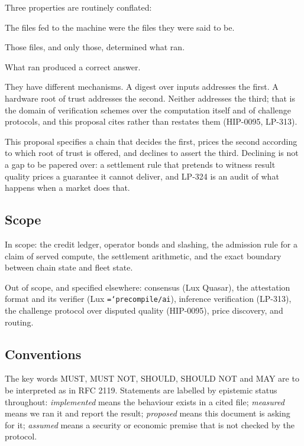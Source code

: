 \documentclass[11pt,a4paper]{article}
\newcommand{\code}[1]{\texttt{\hyphenchar\font=`\-\relax #1}}
\begin{document}
Three properties are routinely conflated:

\begin{description}[leftmargin=1.4em]
  \item[Integrity of the inputs.] The files fed to the machine were the files
    they were said to be.
  \item[Fidelity of execution.] Those files, and only those, determined what
    ran.
  \item[Quality of the result.] What ran produced a correct answer.
\end{description}

They have different mechanisms. A digest over inputs addresses the first. A
hardware root of trust addresses the second. Neither addresses the third; that
is the domain of verification schemes over the computation itself and of
challenge protocols, and this proposal cites rather than restates them
(HIP-0095, LP-313).

This proposal specifies a chain that decides the first, prices the second
according to which root of trust is offered, and declines to assert the third.
Declining is not a gap to be papered over: a settlement rule that pretends to
witness result quality prices a guarantee it cannot deliver, and LP-324 is an
audit of what happens when a market does that.

\subsection{Scope}

In scope: the credit ledger, operator bonds and slashing, the admission rule
for a claim of served compute, the settlement arithmetic, and the exact
boundary between chain state and fleet state.

Out of scope, and specified elsewhere: consensus (Lux Quasar), the attestation
format and its verifier (Lux \code{precompile/ai}), inference verification
(LP-313), the challenge protocol over disputed quality (HIP-0095), price
discovery, and routing.

\subsection{Conventions}

The key words MUST, MUST NOT, SHOULD, SHOULD NOT and MAY are to be interpreted
as in RFC 2119. Statements are labelled by epistemic status throughout:
\emph{implemented} means the behaviour exists in a cited file; \emph{measured}
means we ran it and report the result; \emph{proposed} means this document is
asking for it; \emph{assumed} means a security or economic premise that is not
checked by the protocol.
\end{document}
